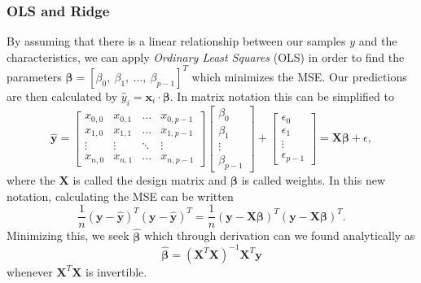 \documentclass{article}
\theoremstyle{definition}
\begin{document}
\subsubsection{OLS and Ridge}
By assuming that there is a linear relationship between our samples $y$ and the characteristics, we can apply \textit{Ordinary Least Squares} (OLS) in order to find the parameters $\boldsymbol{\beta} = \left[ \beta_0, \ \beta_1,  \ \ldots, \ \beta_{p-1} \right]^T$ which minimizes the MSE. Our predictions are then calculated by $\hat{y}_i = \boldsymbol{x}_i \cdot \boldsymbol{\beta}$. In matrix notation this can be simplified to
\begin{equation*}
    \hat{\boldsymbol{y}} =
    \begin{bmatrix}
        x_{0,0} & x_{0,1} & \ldots & x_{0, p-1} \\
        x_{1,0} & x_{1,1} & \ldots & x_{1, p-1} \\
        \vdots & \vdots & \ddots & \vdots \\
        x_{n,0} & x_{n,1} & \ldots & x_{n, p-1}
    \end{bmatrix}
    \begin{bmatrix}
        \beta_0 \\
        \beta_1 \\
        \vdots \\
        \beta_{p-1}
    \end{bmatrix}
    +
    \begin{bmatrix}
        \epsilon_0 \\
        \epsilon_1 \\
        \vdots \\
        \epsilon_{p-1}
    \end{bmatrix}
    = \mathbf{X}\boldsymbol{\beta} + \epsilon,
\end{equation*}
where the $\mathbf{X}$ is called the design matrix and $\boldsymbol{\beta}$ is called weights. In this new notation, calculating the MSE can be written
\begin{equation*}
    \frac{1}{n} \left( \boldsymbol{y} - \hat{\boldsymbol{y}} \right)^T \left( \boldsymbol{y} - \hat{\boldsymbol{y}} \right)^T = \frac{1}{n} \left( \boldsymbol{y} - \mathbf{X}\boldsymbol{\beta} \right)^T \left( \boldsymbol{y} - \mathbf{X}\boldsymbol{\beta} \right)^T.
\end{equation*}
Minimizing this, we seek $\hat{\boldsymbol{\beta}}$ which through derivation can we found analytically as
\begin{equation*}
    \hat{\boldsymbol{\beta}} = \left( \mathbf{X}^T \mathbf{X} \right)^{-1} \mathbf{X}^T \boldsymbol{y}
\end{equation*}
whenever $\mathbf{X}^T \mathbf{X}$ is invertible.
\end{document}
